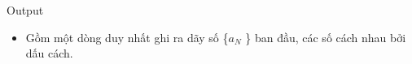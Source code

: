 Output
\begin{itemize}
	\item     Gồm một dòng duy nhất ghi ra dãy số \{$a_{N}$    \} ban đầu, các số cách nhau bởi dấu cách.   
\end{itemize}